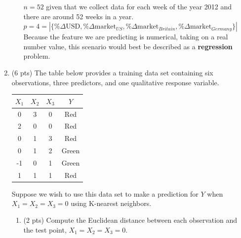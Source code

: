 \documentclass[a4paper]{article}
\theoremstyle{definition}
\newenvironment{soln}{
    \leavevmode\color{blue}\ignorespaces
}{}
\begin{document}
\begin{enumerate}
\begin{enumerate}
	\begin{soln}   
            $n = 52$ given that we collect data for each week of the year 2012 and there are around 52 weeks in a year.
            \\ $p = 4 = |\{ \% \Delta \text{USD}, \%\Delta \text{market}_{US}, \%\Delta \text{market}_{Britain}, \%\Delta \text{market}_{Germany}\}|$
            \\ Because the feature we are predicting is numerical, taking on a real number value, this scenario would best be described as a \textbf{regression} problem.
        \end{soln}
	
\end{enumerate}

\item (6 pts) The table below provides a training data set containing six observations, three predictors, and one qualitative response variable.

\begin{center}
	\begin{tabular}{ c  c  c  c}
		\hline
		$X_{1}$ & $X_{2}$ & $X_{3}$ & $Y$ \\ \hline
		0 & 3 & 0 & Red \\
		2 & 0 & 0 & Red \\
		0 & 1 & 3 & Red \\
		0 & 1 & 2 & Green \\
		-1 & 0 & 1 & Green \\
		1 & 1 & 1 & Red  \\
		\hline
	\end{tabular}
\end{center}

Suppose we wish to use this data set to make a prediction for $Y$ when $X_{1} = X_{2} = X_{3} = 0$ using K-nearest neighbors.

\begin{enumerate}
	\item (2 pts) Compute the Euclidean distance between each observation and the test point, $X_{1} = X_{2} = X_{3}=0$.
 

\end{enumerate}
\end{enumerate}
\end{document}
